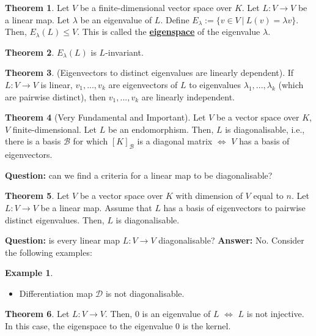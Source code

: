 \documentclass[11pt]{scrartcl}
\theoremstyle{definition}
\newtheorem{theorem}{Theorem}
\newtheorem{ex}{Example}
\theoremstyle{remark}
\newcommand{\dfn}[1]{\textbf{\underline{#1}}}
\begin{document}
\begin{theorem}
	Let $V$ be a finite-dimensional vector space over $K$. Let $L: V \rightarrow V$ be a linear map. Let $\lambda$ be an eigenvalue of $L$. Define $E_\lambda := \{ v \in V\ |\ L(v) = \lambda v \}$. Then, $E_\lambda (L) \leq V$. This is called the \dfn{eigenspace} of the eigenvalue $\lambda$. 
\end{theorem}

\begin{theorem}
	$E_\lambda(L)$ is $L$-invariant. 
\end{theorem}

\begin{theorem}
	(Eigenvectors to distinct eigenvalues are linearly dependent). If $L: V \rightarrow V$ is linear, $v_1, ..., v_k$ are eigenvectors of $L$ to eigenvalues $\lambda_1, ..., \lambda_k$ (which are pairwise distinct), then $v_1, ..., v_k$ are linearly independent. 
\end{theorem}

\begin{theorem}[Very Fundamental and Important]
	Let $V$ be a vector space over $K$, $V$ finite-dimensional. Let $L$ be an endomorphism. Then, $L$ is diagonalisable, i.e., there is a basis $\mathcal{B}$ for which $[K]_{\mathcal{B}}$ is a diagonal matrix $\iff$ $V$ has a basis of eigenvectors. 
\end{theorem}

\textbf{Question:} can we find a criteria for a linear map to be diagonalisable? 

\begin{theorem}
	Let $V$ be a vector space over $K$ with dimension of $V$ equal to $n$. Let $L: V \rightarrow V$ be a linear map. Assume that $L$ has a basis of eigenvectors to pairwise distinct eigenvalues. Then, $L$ is diagonalisable. 
\end{theorem}

\textbf{Question:} is every linear map $L: V \rightarrow V$ diagonalisable?
\newline
\newline
\textbf{Answer:} No. Consider the following examples: 
\begin{ex}
	\begin{itemize}
		\item Differentiation map $\mathcal{D}$ is not diagonalisable. 
	\end{itemize}
\end{ex}

\begin{theorem}
	Let $L: V \rightarrow V$. Then, $0$ is an eigenvalue of $L$ $\iff$ $L$ is not injective. In this case, the eigenspace to the eigenvalue $0$ is the kernel. 
\end{theorem}
\end{document}
